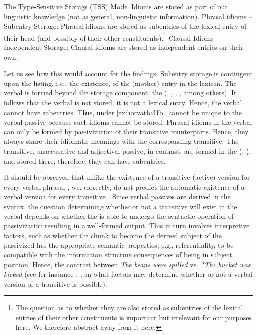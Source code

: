 \documentclass[output=paper,
modfonts
]{LSP/langsci}
\begin{document}
\ea \label{ex:horvath:31} The Type-Sensitive Storage (TSS) Model
	\ea \label{ex:horvath:31a} Idioms are stored as part of our linguistic knowledge (not as
	general, non-linguistic information).
	\ex \label{ex:horvath:31b} Phrasal idioms -- Subentry Storage: Phrasal idioms are stored as	
	subentries of the lexical entry of their head (and possibly of their other constituents).\footnote{The
  question as to whether they are also stored as subentries of the
  lexical entries of their other constituents is important but
  irrelevant for our purposes here. We therefore abstract away from it
  here.}
	\ex \label{ex:horvath:31c} Clausal Idioms -- Independent Storage: Clausal idioms are stored as
	independent entries on their own.
	\z
\z

Let us see how this would account for the findings.  Subentry storage is contingent upon the listing, i.e., the
existence, of the (mother) entry in the lexicon. The verbal  is
formed beyond the storage component, the  (\citealt{baker1989}, \citealt{collins2005}, \citealt{horvath2008}, \citealt{meltzer2012}, among
others). It follows that the verbal  is not stored; it is not a
lexical entry. Hence, the verbal  cannot have subentries. Thus,
under \ref{ex:horvath:31b},  cannot be unique to the verbal passive
because such idioms cannot be stored. Phrasal idioms in the verbal
 can only be formed by passivization of their transitive
counterparts. Hence, they always share their idiomatic meanings with the
corresponding transitive. The transitive, unaccusative and adjectival
passive, in contrast, are formed in the  (\citealt{horvath2008,horvath2011}, \citealt{reinhart2002}), and stored there; therefore, they can have
subentries.

It should be observed that unlike the existence of a transitive (active)
version for every verbal  phrasal , we, correctly, do not
predict the automatic existence of a verbal  version for every
transitive . Since verbal passives are derived in the syntax, the
question determining whether or not a transitive  will exist in the
verbal  depends on whether the  is able to undergo the
syntactic operation of passivization resulting in a well-formed output.
This in turn involves interpretive factors, such as whether the 
chunk to become the derived subject of the passivized  has the
appropriate semantic properties, e.g., referentiality, to be compatible
with the information structure consequences of being in subject
position. Hence, the contrast between \emph{The beans were spilled}
vs. \emph{*The bucket was kicked} (see for instance \citealt{nunberg1994}, \citealt{ruwet1991}, \citealt{punske2014} on what factors may
determine whether or not a verbal  version of a transitive 
is possible).
\end{document}
